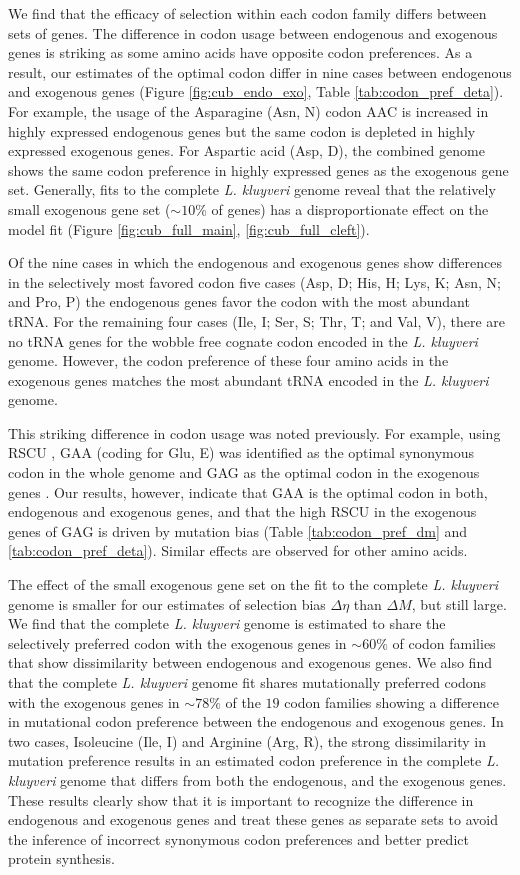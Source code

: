 \documentclass[doublespacing,linenumbers]{bmcart}
\newcommand{\kluyveri}{\textit{L. kluyveri}\xspace}
\newcommand{\DM}{\ensuremath{{\Delta M}}\xspace}
\newcommand{\DE}{\ensuremath{{\Delta \eta}}\xspace}
\begin{document}
We find that the efficacy of selection within each codon family differs between sets of genes.
The difference in codon usage between endogenous and exogenous genes is striking as some amino acids have opposite codon preferences. 
As a result, our estimates of the optimal codon differ in nine cases between endogenous and exogenous genes (Figure \ref{fig:cub_endo_exo}, Table \ref{tab:codon_pref_deta}).
For example, the usage of the Asparagine (Asn, N) codon AAC is increased in highly expressed endogenous genes but the same codon is depleted in highly expressed exogenous genes.
For Aspartic acid (Asp, D), the combined genome shows the same codon preference in highly expressed genes as the exogenous gene set.
Generally, fits to the complete \kluyveri genome reveal that the relatively small exogenous gene set ($\sim 10\%$ of genes) has a disproportionate effect on the model fit (Figure \ref{fig:cub_full_main}, \ref{fig:cub_full_cleft}).

Of the nine cases in which the endogenous and exogenous genes show differences in the selectively most favored codon five cases (Asp, D; His, H; Lys, K; Asn, N; and Pro, P) the endogenous genes favor the codon with the most abundant tRNA.
For the remaining four cases (Ile, I; Ser, S; Thr, T; and Val, V), there are no tRNA genes for the wobble free cognate codon encoded in the \kluyveri genome.
However, the codon preference of these four amino acids in the exogenous genes matches the most abundant tRNA encoded in the \kluyveri genome.

This striking difference in codon usage was noted previously.
For example, using RSCU \citep{sharp1987}, GAA (coding for Glu, E) was identified as the optimal synonymous codon in the whole genome and GAG as the optimal codon in the exogenous genes  \cite{payen2009}.
Our results, however, indicate that GAA is the optimal codon in both, endogenous and exogenous genes, and that the high RSCU in the exogenous genes of GAG is driven by mutation bias (Table \ref{tab:codon_pref_dm} and \ref{tab:codon_pref_deta}).
Similar effects are observed for other amino acids.

The effect of the small exogenous gene set on the fit to the complete \kluyveri genome is smaller for our estimates of selection bias \DE than \DM, but still large.
We find that the complete \kluyveri genome is estimated to share the selectively preferred codon with the exogenous genes in $\sim60\%$ of codon families that show dissimilarity between endogenous and exogenous genes.
We also find that the complete \kluyveri genome fit shares mutationally preferred codons with the exogenous genes in $\sim78\%$ of the $19$ codon families showing a difference in mutational codon preference between the endogenous and exogenous genes.
In two cases, Isoleucine (Ile, I) and Arginine (Arg, R), the strong dissimilarity in mutation preference results in an estimated codon preference in the complete \kluyveri genome that differs from both the endogenous, and the exogenous genes.
These results clearly show that it is important to recognize the difference in endogenous and exogenous genes and treat these genes as separate sets to avoid the inference of incorrect synonymous codon preferences and better predict protein synthesis.
\end{document}
